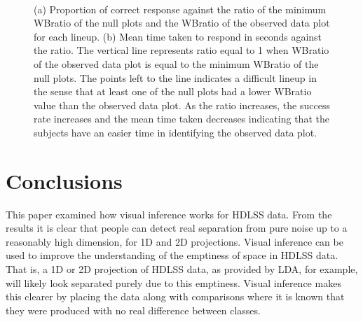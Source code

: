 \begin{figure}[htbp]
\centering
\mbox{\quad
{}}
\caption{(a) Proportion of correct response against the ratio of the minimum WBratio of the null plots and the WBratio of the observed data plot for each lineup. (b) Mean time taken to respond in seconds against the ratio.  The vertical line represents ratio equal to 1 when WBratio of the observed data plot is equal to the minimum WBratio of the null plots. The points left to the line indicates a difficult lineup in the sense that at least one of the null plots had a lower WBratio value than the observed data plot. As the ratio increases, the success rate increases and the mean time taken decreases indicating that the subjects have an easier time in identifying the observed data plot. } 
\label{null}
\end{figure}

\section{Conclusions}

This paper examined how visual inference works for HDLSS data. From the results it is clear that people can detect real separation from pure noise  up to a reasonably high dimension, for 1D and 2D projections. Visual inference can be used to improve the understanding of the emptiness of space in HDLSS data. That is, a 1D or 2D projection of HDLSS data,  as provided by LDA, for example, will likely look separated purely due to this emptiness. Visual inference makes this clearer by placing the data along with comparisons where it is known that they were produced with no real difference between classes.

